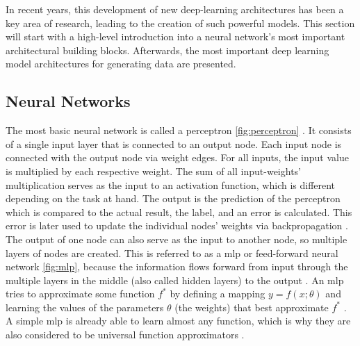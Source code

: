 In recent years, this development of new deep-learning architectures has been a key area of research, leading to the creation of such powerful models.
This section will start with a high-level introduction into a neural network's most important architectural building blocks.
Afterwards, the most important deep learning model architectures for generating data are presented.

\subsection{Neural Networks}
\label{ch:preliminaries-deepLearningArchitectures-neuralNetworks}

The most basic neural network is called a perceptron \autoref{fig:perceptron} \cite{rosenblatt1958PerceptronProbabilisticModel}.
It consists of a single input layer that is connected to an output node.
Each input node is connected with the output node via weight edges.
For all inputs, the input value is multiplied by each respective weight.
The sum of all input-weights' multiplication serves as the input to an activation function, which is different depending on the task at hand.
The output is the prediction of the perceptron which is compared to the actual result, the label, and an error is calculated.
This error is later used to update the individual nodes' weights via backpropagation \cite{aggarwal2018NeuralNetworksDeep}.
The output of one node can also serve as the input to another node, so multiple layers of nodes are created.
This is referred to as a \gls{mlp} or feed-forward neural network \autoref{fig:mlp}, 
because the information flows forward from input through the multiple layers in the middle (also called hidden layers) to the output \cite{aggarwal2018NeuralNetworksDeep, Goodfellow-et-al-2016}.
An \gls{mlp} tries to approximate some function $f^*$ by defining a mapping $y=f(x;\theta)$ and learning the values of the parameters $\theta$ (\ie the weights) that best approximate $f^*$ \cite{Goodfellow-et-al-2016}.
A simple \gls{mlp} is already able to learn almost any function, which is why they are also considered to be universal function approximators \cite{aggarwal2018NeuralNetworksDeep, hornik1989MultilayerFeedforwardNetworks}.


